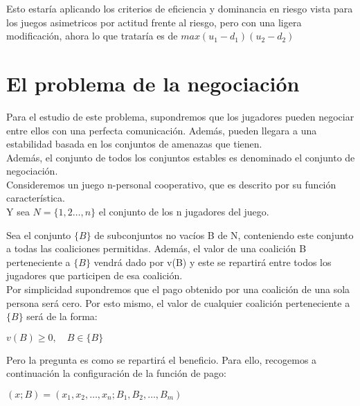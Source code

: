 \documentclass[10pt,a4paper]{book}
\begin{document}
Esto estaría aplicando los criterios de eficiencia y dominancia en riesgo vista para los juegos asimetricos por actitud frente al riesgo, pero con una ligera modificación, ahora lo que trataría es de $max(u_1-d_1)(u_2-d_2)$\\







\newpage

\chapter{El problema de la negociación}


Para el estudio de este problema, supondremos que los jugadores pueden negociar entre ellos con una perfecta comunicación. Además, pueden llegara a una estabilidad basada en los conjuntos de amenazas que tienen.\\

Además, el conjunto de todos los conjuntos estables es denominado el conjunto de negociación.\\

Consideremos un juego n-personal cooperativo, que es descrito por su función característica.\\
Y sea $N=\{1,2 \ldots ,n\}$ el conjunto de los n jugadores del juego.

Sea el conjunto $\{B\}$ de subconjuntos no vacíos B de N, conteniendo este conjunto a todas las coaliciones permitidas. Además, el valor de una coalición B perteneciente a $\{B\}$ vendrá dado por v(B) y este se repartirá entre todos los jugadores que participen de esa coalición.\\

Por simplicidad supondremos que el pago obtenido por una coalición de una sola persona será cero. Por esto mismo, el valor de cualquier coalición perteneciente a $\{B\}$ será de la forma:\\

\begin{center}

$v(B) \geq 0 , \quad B \in \{B\}$

\end{center}

Pero la pregunta es como se repartirá el beneficio. Para ello, recogemos a continuación la configuración de la función de pago:\\

\begin{center}

$(x;B)=(x_1,x_2,\ldots,x_n;B_1,B_2,\ldots ,B_m)$

\end{center}
\end{document}
